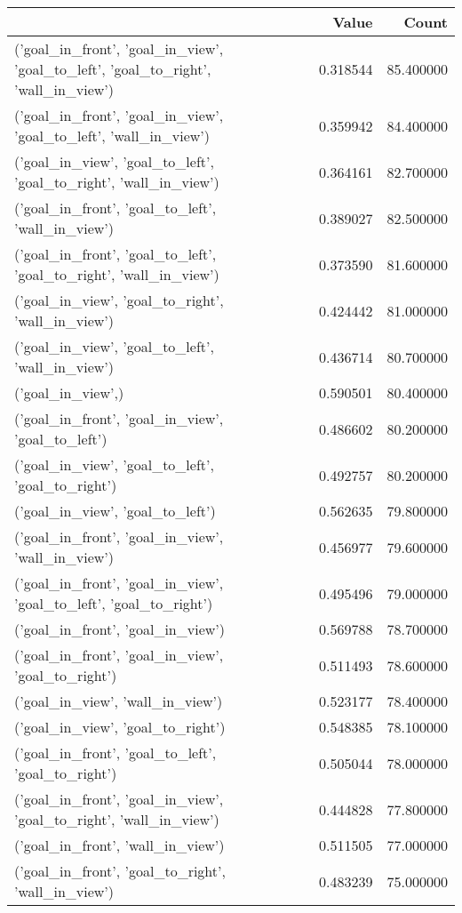 \begin{tabular}{lrr}
\toprule
 & Value & Count \\
\midrule
('goal\_in\_front', 'goal\_in\_view', 'goal\_to\_left', 'goal\_to\_right', 'wall\_in\_view') & 0.318544 & 85.400000 \\
('goal\_in\_front', 'goal\_in\_view', 'goal\_to\_left', 'wall\_in\_view') & 0.359942 & 84.400000 \\
('goal\_in\_view', 'goal\_to\_left', 'goal\_to\_right', 'wall\_in\_view') & 0.364161 & 82.700000 \\
('goal\_in\_front', 'goal\_to\_left', 'wall\_in\_view') & 0.389027 & 82.500000 \\
('goal\_in\_front', 'goal\_to\_left', 'goal\_to\_right', 'wall\_in\_view') & 0.373590 & 81.600000 \\
('goal\_in\_view', 'goal\_to\_right', 'wall\_in\_view') & 0.424442 & 81.000000 \\
('goal\_in\_view', 'goal\_to\_left', 'wall\_in\_view') & 0.436714 & 80.700000 \\
('goal\_in\_view',) & 0.590501 & 80.400000 \\
('goal\_in\_front', 'goal\_in\_view', 'goal\_to\_left') & 0.486602 & 80.200000 \\
('goal\_in\_view', 'goal\_to\_left', 'goal\_to\_right') & 0.492757 & 80.200000 \\
('goal\_in\_view', 'goal\_to\_left') & 0.562635 & 79.800000 \\
('goal\_in\_front', 'goal\_in\_view', 'wall\_in\_view') & 0.456977 & 79.600000 \\
('goal\_in\_front', 'goal\_in\_view', 'goal\_to\_left', 'goal\_to\_right') & 0.495496 & 79.000000 \\
('goal\_in\_front', 'goal\_in\_view') & 0.569788 & 78.700000 \\
('goal\_in\_front', 'goal\_in\_view', 'goal\_to\_right') & 0.511493 & 78.600000 \\
('goal\_in\_view', 'wall\_in\_view') & 0.523177 & 78.400000 \\
('goal\_in\_view', 'goal\_to\_right') & 0.548385 & 78.100000 \\
('goal\_in\_front', 'goal\_to\_left', 'goal\_to\_right') & 0.505044 & 78.000000 \\
('goal\_in\_front', 'goal\_in\_view', 'goal\_to\_right', 'wall\_in\_view') & 0.444828 & 77.800000 \\
('goal\_in\_front', 'wall\_in\_view') & 0.511505 & 77.000000 \\
('goal\_in\_front', 'goal\_to\_right', 'wall\_in\_view') & 0.483239 & 75.000000 \\

\end{tabular}
